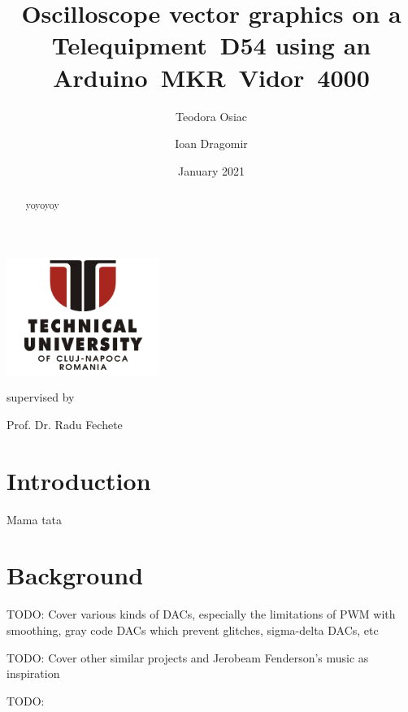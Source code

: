 \documentclass[12pt]{report}
\title{Oscilloscope vector graphics on a \mbox{Telequipment D54} using an \mbox{Arduino MKR Vidor 4000}}
\author{Teodora Osiac \and Ioan Dragomir}
\date{January 2021}
\begin{document}
\makeatletter
\renewcommand{\and}{\quad}
\begin{titlepage}
	\vspace*{\fill}
	\centering

	\makeatletter
	\centering{\LARGE\bfseries \@title \par} \vspace{1.5cm}

	\includegraphics[height=1.5in]{tucn-logo.jpg}\par

	\vspace{1.5cm}
	{\Large\@author \par}\vspace{0.45cm}

	{\large supervised by\par
	Prof. Dr. Radu Fechete}

	\vspace*{\fill}
	{\large \@date\par}
\end{titlepage}
\makeatother

\begin{abstract}
yoyoyoy
\end{abstract}

\setcounter{tocdepth}{2}
\tableofcontents

\section{Introduction}

Mama tata

\section{Background}

TODO: Cover various kinds of DACs, especially the limitations of PWM with smoothing, gray code DACs which prevent glitches, sigma-delta DACs, etc

TODO: Cover other similar projects and Jerobeam Fenderson's music as inspiration

TODO: 
\end{document}
